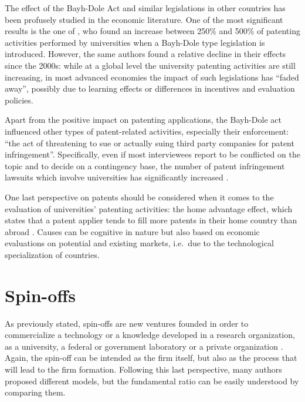 The effect of the Bayh-Dole Act and similar legislations in other countries has been profusely studied in the economic literature. One of the most significant results is the one of \citet{Leydesdorff2010}, who found an increase between 250\% and 500\% of patenting activities performed by universities when a Bayh-Dole type legislation is introduced. However, the same authors found a relative decline in their effects since the 2000s: while at a global level the university patenting activities are still increasing, in most advanced economies the impact of such legislations has \enquote{faded away}, possibly due to learning effects or differences in incentives and evaluation policies.

Apart from the positive impact on patenting applications, the Bayh-Dole act influenced other types of patent-related activities, especially their enforcement: \enquote{the act of threatening to sue or actually suing third party companies for patent infringement}. Specifically, even if most interviewees report to be conflicted on the topic and to decide on a contingency base, the number of patent infringement lawsuits which involve universities has significantly increased \citep{Hayter2016}.

One last perspective on patents should be considered when it comes to the evaluation of universities' patenting activities: the home advantage effect, which states that a patent applier tends to fill more patents in their home country than abroad \citep{Criscuolo2005}. Causes can be cognitive in nature but also based on economic evaluations on potential and existing markets, i.e.\ due to the technological specialization of countries.

\section{Spin-offs}

As previously stated, spin-offs are new ventures founded in order to commercialize a technology or a knowledge developed in a research organization, as a university, a federal or government laboratory or a private organization \citep{Rogers2001}. Again, the spin-off can be intended as the firm itself, but also as the process that will lead to the firm formation. Following this last perspective, many authors proposed different models, but the fundamental ratio can be easily understood by comparing them.

